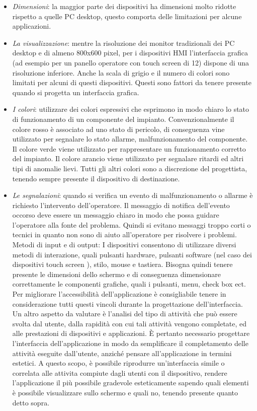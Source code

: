 \documentclass[12pt, a4paper, oneside]{book}
\begin{document}
\begin{itemize}
	\item \textit{Dimensioni}: la maggior parte dei dispositivi ha dimensioni molto ridotte rispetto a quelle PC desktop, questo comporta delle limitazioni per alcune applicazioni.
	\item \textit{La visualizzazione}: mentre la risoluzione dei monitor tradizionali dei PC desktop e di almeno 800x600 pixel, per i dispositivi HMI l'interfaccia grafica (ad esempio per un panello operatore con touch screen di 12) dispone di una risoluzione inferiore. Anche la scala di grigio e il numero di colori sono limitati per alcuni di questi dispositivi. Questi sono fattori da tenere presente quando si progetta un interfaccia grafica.
	\item \textit{I colori}: utilizzare dei colori espressivi che esprimono in modo chiaro lo stato di funzionamento di un componente del impianto. Convenzionalmente il colore rosso è associato ad uno stato di pericolo, di conseguenza vine utilizzato per segnalare lo stato allarme, malfunzionamento del componente. Il colore verde viene utilizzato per rappresentare un funzionamento corretto del impianto. Il colore arancio viene utilizzato per segnalare ritardi ed altri tipi di anomalie lievi. Tutti gli altri colori sono a discrezione del progettista, tenendo sempre presente il dispositivo di destinazione.
	\item \textit{Le segnalazioni}: quando si verifica un evento di malfunzionamento o allarme è richiesto l'intervento dell'operatore. Il messaggio di notifica dell'evento occorso deve essere un messaggio chiaro in modo che possa guidare l'operatore alla fonte del problema. Quindi si evitano messaggi troppo corti o tecnici in quanto non sono di aiuto all'operatore per risolvere i problemi. 
	\\Metodi di input e di output: I dispositivi consentono di utilizzare diversi metodi di interazione, quali pulsanti hardware, pulsanti software (nel caso dei dispositivi touch screen ), stilo, mouse e tastiera. Bisogna quindi tenere presente le dimensioni dello schermo e di conseguenza dimensionare correttamente le componenti grafiche, quali i pulsanti, menu, check box ect. Per migliorare l'accessibilità dell'applicazione è consigliabile tenere in considerazione tutti questi vincoli durante la progettazione dell'interfaccia. Un altro aspetto da valutare è l'analisi del tipo di attività che può essere svolta dal utente, dalla rapidità con cui tali attività vengono completate, ed alle prestazioni di dispositivi e applicazioni. È pertanto necessario progettare l'interfaccia dell'applicazione in modo da semplificare il completamento delle attività eseguite dall'utente, anziché pensare all'applicazione in termini estetici. A questo scopo, è possibile riprodurre un'interfaccia simile o correlata alle attivita compiute dagli utenti con il dispositivo, rendere l'applicazione il più possibile gradevole esteticamente	sapendo quali elementi è possibile visualizzare sullo schermo e quali no, tenendo presente quanto detto sopra.
\end{itemize}
\end{document}
